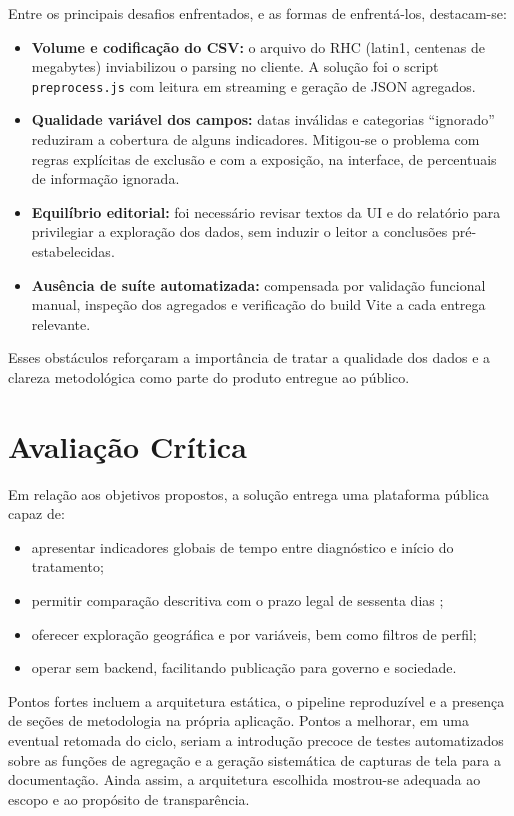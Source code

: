 Entre os principais desafios enfrentados, e as formas de enfrentá-los, destacam-se:

\begin{itemize}
	\item \textbf{Volume e codificação do \acs{CSV}:} o arquivo do \acs{RHC} (latin1, centenas de megabytes) inviabilizou o parsing no cliente. A solução foi o script \texttt{preprocess.js} com leitura em streaming e geração de \acs{JSON} agregados.
	\item \textbf{Qualidade variável dos campos:} datas inválidas e categorias ``ignorado'' reduziram a cobertura de alguns indicadores. Mitigou-se o problema com regras explícitas de exclusão e com a exposição, na interface, de percentuais de informação ignorada.
	\item \textbf{Equilíbrio editorial:} foi necessário revisar textos da \acs{UI} e do relatório para privilegiar a exploração dos dados, sem induzir o leitor a conclusões pré-estabelecidas.
	\item \textbf{Ausência de suíte automatizada:} compensada por validação funcional manual, inspeção dos agregados e verificação do build Vite a cada entrega relevante.
\end{itemize}

Esses obstáculos reforçaram a importância de tratar a qualidade dos dados e a clareza metodológica como parte do produto entregue ao público.

\section{Avaliação Crítica}

Em relação aos objetivos propostos, a solução entrega uma plataforma pública capaz de:

\begin{itemize}
	\item apresentar indicadores globais de tempo entre diagnóstico e início do tratamento;
	\item permitir comparação descritiva com o prazo legal de sessenta dias \cite{lei12732};
	\item oferecer exploração geográfica e por variáveis, bem como filtros de perfil;
	\item operar sem backend, facilitando publicação para governo e sociedade.
\end{itemize}

Pontos fortes incluem a arquitetura estática, o pipeline reproduzível e a presença de seções de metodologia na própria aplicação. Pontos a melhorar, em uma eventual retomada do ciclo, seriam a introdução precoce de testes automatizados sobre as funções de agregação e a geração sistemática de capturas de tela para a documentação. Ainda assim, a arquitetura escolhida mostrou-se adequada ao escopo e ao propósito de transparência.

